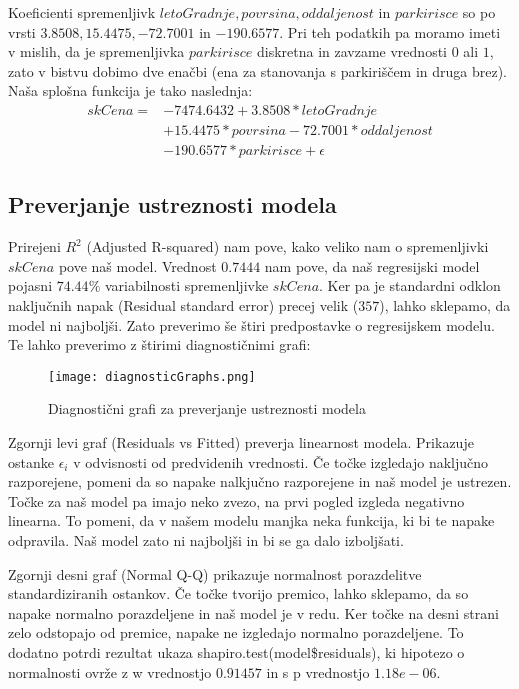 \documentclass[a4paper, 12pt]{article}
\begin{document}
Koeficienti spremenljivk $ letoGradnje, povrsina, oddaljenost $ in
$ parkirisce $ so po vrsti $ 3.8508, 15.4475, -72.7001 $ in $ -190.6577 $. Pri
teh podatkih pa moramo imeti v mislih, da je spremenljivka $ parkirisce $
diskretna in zavzame vrednosti $ 0 $ ali $ 1 $, zato v bistvu dobimo dve
enačbi (ena za stanovanja s parkiriščem in druga brez). Naša splošna funkcija
je tako naslednja:
\begin{equation}
\begin{split}
	skCena = &-7474.6432+3.8508*letoGradnje \\
			&+15.4475*povrsina-72.7001*oddaljenost \\
			&-190.6577*parkirisce+\epsilon
\end{split}
\end{equation}

\subsection{Preverjanje ustreznosti modela}

Prirejeni $ R^{2} $ (Adjusted R-squared) nam pove, kako veliko nam o
spremenljivki $ skCena $ pove naš model. Vrednost $ 0.7444 $ nam pove, da naš
regresijski model pojasni $ 74.44\% $ variabilnosti spremenljivke $ skCena $.
Ker pa je standardni odklon naključnih napak (Residual standard error) precej
velik ($ 357 $), lahko sklepamo, da model ni najboljši. Zato preverimo še štiri
predpostavke o regresijskem modelu. Te lahko preverimo z štirimi diagnostičnimi
grafi:
\begin{figure}[H]
	\centering
	\texttt{[image: diagnosticGraphs.png]}
	\caption{Diagnostični grafi za preverjanje ustreznosti modela}
	\label{figure:3}
\end{figure}

Zgornji levi graf (Residuals vs Fitted) preverja linearnost modela. Prikazuje
ostanke $ \epsilon_{i} $ v odvisnosti od predvidenih vrednosti. Če točke
izgledajo naključno razporejene, pomeni da so napake nalkjučno razporejene in
naš model je ustrezen. Točke za naš model pa imajo neko zvezo, na prvi pogled
izgleda negativno linearna. To pomeni, da v našem modelu manjka neka funkcija,
ki bi te napake odpravila. Naš model zato ni najboljši in bi se ga dalo
izboljšati.

Zgornji desni graf (Normal Q-Q) prikazuje normalnost porazdelitve
standardiziranih ostankov. Če točke tvorijo premico, lahko sklepamo, da so
napake normalno porazdeljene in naš model je v redu. Ker točke na desni strani
zelo odstopajo od premice, napake ne izgledajo normalno porazdeljene. To
dodatno potrdi rezultat ukaza {\sf shapiro.test(model\$residuals)}, ki hipotezo
o normalnosti ovrže z w vrednostjo $ 0.91457 $ in s p vrednostjo $ 1.18e-06 $.
\end{document}
